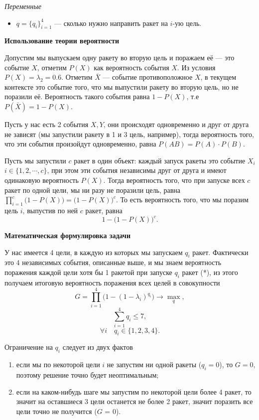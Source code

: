 \bigskip

\textit{Переменные}

\begin{itemize}[nosep]	
	\item $q = \{q_i\}_{i=1}^4$ --- сколько нужно направить ракет на $i$-ую цель.
\end{itemize}

\bigskip

\textbf{Использование теории вероятности}

Допустим мы выпускаем одну ракету во вторую цель и поражаем её --- это событие $X$, отметим $P(X)$ как вероятность события $X$. Из условия $P(X) = \lambda_2 = 0.6$. Отметим $\bar{X}$ --- событие противоположное $X$, в текущем контексте это событие того, что мы выпустили ракету во вторую цель, но не поразили её. Вероятность такого события равна $1 - P(X)$, т.е $P(\bar{X})=1-P(X)$.

Пусть у нас есть 2 события $X, Y$, они происходят одновременно и друг от друга не зависят (мы запустили ракету в 1 и 3 цель, например), тогда вероятность того, что эти события произойдут одновременно, равна $P(AB)=P(A) \cdot P(B)$.

Пусть мы запустили $c$ ракет в один объект: каждый запуск ракеты это событие $X_i$ $i \in \{1, 2, \cdots, c\}$, при этом эти события независимы друг от друга и имеют одинаковую вероятность $P(X)$. Тогда вероятность того, что при запуске всех $c$ ракет по одной цели, мы ни разу не поразили цель, равна $\displaystyle \prod_{i=1}^{c} \big(1 - P(X)\big) = \big(1 - P(X)\big)^c$. То есть вероятность того, что мы поразим цель $i$, выпустив по ней $c$ ракет, равна 
\[1 - \big(1 - P(X)\big)^c. \tag{*}\]

\textbf{Математическая формулировка задачи}

У нас имеется 4 цели, в каждую из которых мы запускаем $q_i$ ракет. Фактически это 4 независимых события, описанные выше, и мы знаем вероятность поражения каждой цели хотя бы 1 ракетой при запуске $q_i$ ракет (*), из этого получаем итоговую вероятность поражения всех целей в совокупности
\[G = \displaystyle \prod_{i=1}^{4} \big(1 - (1 - \lambda_i)^{q_i}\big) \to \max_q,\]
\[\sum_{i=1}^4 q_i \le 7,\]
\[\forall i \quad q_i \in \{1, 2, 3, 4\}.\]

Ограничение на $q_i$ следует из двух фактов

\begin{enumerate}[nosep]
	\item если мы по некоторой цели $i$ не запустим ни одной ракеты ($q_i = 0$), то $G = 0$, поэтому решение точно будет неоптимальным;
	
	\item если на каком-нибудь шаге мы запустим по некоторой цели более 4 ракет, то значит на оставшиеся 3 цели останется не более 2 ракет, значит поразить все цели точно не получится ($G$ = 0).
\end{enumerate}

